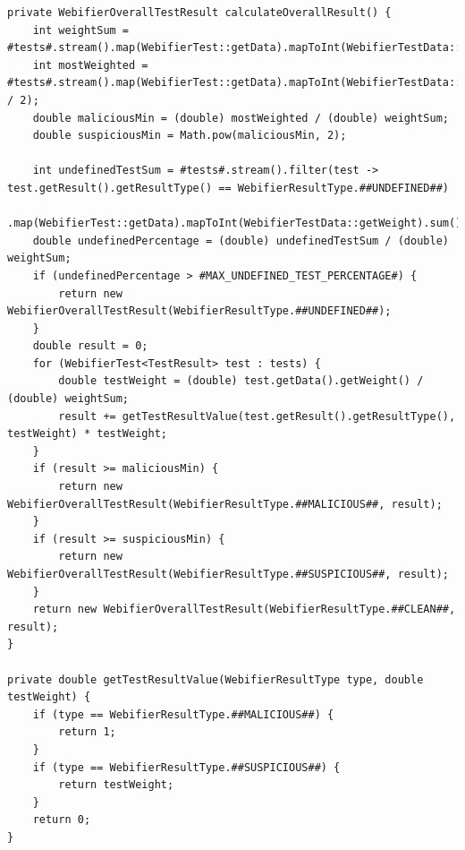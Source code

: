 \begin{scriptsize}
\begin{lstlisting}
private WebifierOverallTestResult calculateOverallResult() {
    int weightSum = #tests#.stream().map(WebifierTest::getData).mapToInt(WebifierTestData::getWeight).sum();
    int mostWeighted = #tests#.stream().map(WebifierTest::getData).mapToInt(WebifierTestData::getWeight).max().orElse(weightSum / 2);
    double maliciousMin = (double) mostWeighted / (double) weightSum;
    double suspiciousMin = Math.pow(maliciousMin, 2);

    int undefinedTestSum = #tests#.stream().filter(test -> test.getResult().getResultType() == WebifierResultType.##UNDEFINED##)
            .map(WebifierTest::getData).mapToInt(WebifierTestData::getWeight).sum();
    double undefinedPercentage = (double) undefinedTestSum / (double) weightSum;
    if (undefinedPercentage > #MAX_UNDEFINED_TEST_PERCENTAGE#) {
        return new WebifierOverallTestResult(WebifierResultType.##UNDEFINED##);
    }
    double result = 0;
    for (WebifierTest<TestResult> test : tests) {
        double testWeight = (double) test.getData().getWeight() / (double) weightSum;
        result += getTestResultValue(test.getResult().getResultType(), testWeight) * testWeight;
    }
    if (result >= maliciousMin) {
        return new WebifierOverallTestResult(WebifierResultType.##MALICIOUS##, result);
    }
    if (result >= suspiciousMin) {
        return new WebifierOverallTestResult(WebifierResultType.##SUSPICIOUS##, result);
    }
    return new WebifierOverallTestResult(WebifierResultType.##CLEAN##, result);
}

private double getTestResultValue(WebifierResultType type, double testWeight) {
    if (type == WebifierResultType.##MALICIOUS##) {
        return 1;
    }
    if (type == WebifierResultType.##SUSPICIOUS##) {
        return testWeight;
    }
    return 0;
}
\end{lstlisting}
\end{scriptsize}

\newpage


